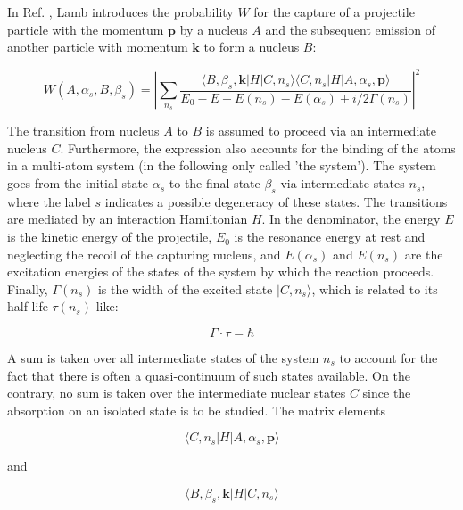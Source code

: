 \documentclass{article}
\begin{document}
In Ref. \cite{Lam39}, Lamb introduces the probability $W$ for the capture of a projectile particle with the momentum $\mathbf{p}$ by a nucleus $A$ and the subsequent emission of another particle with momentum $\mathbf{k}$ to form a nucleus $B$:

\begin{equation}
\label{absorption_general}
W(A, \alpha_s, B, \beta_s) = \left| \sum_{n_s} \frac{\langle B, \beta_s, \mathbf{k} | H | C, n_s \rangle \langle C, n_s | H | A, \alpha_s, \mathbf{p} \rangle }{E_0 - E + E(n_s) - E(\alpha_s) + i/2 \Gamma(n_s)} \right| ^2
\end{equation}

The transition from nucleus $A$ to $B$ is assumed to proceed via an intermediate nucleus $C$. 
Furthermore, the expression also accounts for the binding of the atoms in a multi-atom system (in the following only called 'the system'). 
The system goes from the initial state $\alpha_s$ to the final state $\beta_s$ via intermediate states $n_s$, where the label $s$ indicates a possible degeneracy of these states. 
The transitions are mediated by an interaction Hamiltonian $H$.
In the denominator, the energy $E$ is the kinetic energy of the projectile, $E_0$ is the resonance energy at rest and neglecting the recoil of the capturing nucleus, and $E(\alpha_s)$ and $E(n_s)$ are the excitation energies of the states of the system by which the reaction proceeds.
Finally, $\Gamma(n_s)$ is the width of the excited state $| C, n_s \rangle$, which is related to its half-life $\tau(n_s)$ like:

\begin{equation}
\label{gamma_tau}
	\Gamma \cdot \tau = \hbar
\end{equation}

A sum is taken over all intermediate states of the system $n_s$ to account for the fact that there is often a quasi-continuum of such states available. On the contrary, no sum is taken over the intermediate nuclear states $C$ since the absorption on an isolated state is to be studied.
The matrix elements

\begin{equation}
\label{me_to_intermediate}
	\langle C, n_s | H | A, \alpha_s, \mathbf{p} \rangle
\end{equation}

and

\begin{equation}
\label{me_to_final}
	\langle B, \beta_s, \mathbf{k} | H | C, n_s \rangle
\end{equation}
\end{document}

